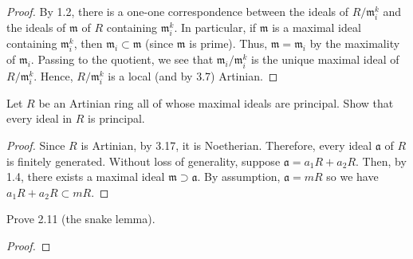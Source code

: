 \begin{proof}
By 1.2, there is a one-one correspondence between the ideals of
$R/\mathfrak{m}_i^k$ and the ideals of $\mathfrak{m}$ of $R$
containing $\mathfrak{m}_i^k$. In particular, if $\mathfrak{m}$
is a maximal ideal containing $\mathfrak{m}_i^k$, then
$\mathfrak{m}_i\subset\mathfrak{m}$ (since $\mathfrak{m}$ is
prime). Thus, $\mathfrak{m}=\mathfrak{m}_i$ by the maximality of
$\mathfrak{m}_i$. Passing to the quotient, we see that
$\mathfrak{m}_i/\mathfrak{m}_i^k$ is the unique maximal ideal of
$R/\mathfrak{m}_i^k$. Hence, $R/\mathfrak{m}_i^k$ is a local (and
by 3.7) Artinian.
\end{proof}
\newpage
\begin{problem}
Let $R$ be an Artinian ring all of whose maximal ideals are
principal. Show that every ideal in $R$ is principal.
\end{problem}
\begin{proof}
Since $R$ is Artinian, by 3.17, it is Noetherian. Therefore,
every ideal $\mathfrak{a}$ of $R$ is finitely generated. Without
loss of generality, suppose $\mathfrak{a}=a_1R+a_2R$. Then, by
1.4, there exists a maximal ideal
$\mathfrak{m}\supset\mathfrak{a}$. By assumption,
$\mathfrak{a}=mR$ so we have $a_1R+a_2R\subset mR$.
\end{proof}
\newpage
\begin{problem}
Prove 2.11 (the snake lemma).
\end{problem}
\begin{proof}
\end{proof}

